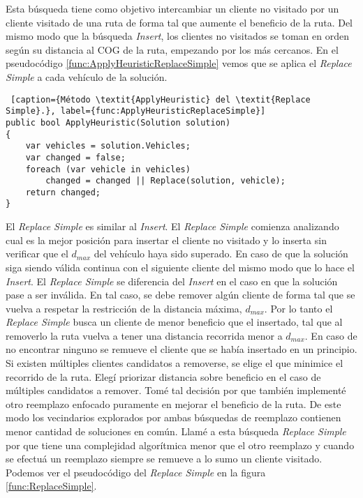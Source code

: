 Esta búsqueda tiene como objetivo intercambiar un cliente no visitado por un cliente visitado de una ruta de forma tal que aumente el beneficio de la ruta. Del mismo modo que la búsqueda \textit{Insert}, los clientes no visitados se toman en orden según su distancia al COG de la ruta, empezando por los más cercanos. En el pseudocódigo \ref{func:ApplyHeuristicReplaceSimple} vemos que se aplica el \textit{Replace Simple} a cada vehículo de la solución.

\bigskip

\begin{minipage}{\textwidth}
\begin{lstlisting} [caption={Método \textit{ApplyHeuristic} del \textit{Replace Simple}.}, label={func:ApplyHeuristicReplaceSimple}]
public bool ApplyHeuristic(Solution solution)
{	
	var vehicles = solution.Vehicles;
	var changed = false;	
	foreach (var vehicle in vehicles)
		changed = changed || Replace(solution, vehicle);
	return changed;
}
\end{lstlisting}
\end{minipage}

\bigskip

El \textit{Replace Simple} es similar al \textit{Insert}. El \textit{Replace Simple} comienza analizando cual es la mejor posición para insertar el cliente no visitado y lo inserta sin verificar que el $d_{max}$ del vehículo haya sido superado. En caso de que la solución siga siendo válida continua con el siguiente cliente del mismo modo que lo hace el \textit{Insert}. El \textit{Replace Simple} se diferencia del \textit{Insert} en el caso en que la solución pase a ser inválida. En tal caso, se debe remover algún cliente de forma tal que se vuelva a respetar la restricción de la distancia máxima, $d_{max}$. Por lo tanto el \textit{Replace Simple} busca un cliente de menor beneficio que el insertado, tal que al removerlo la ruta vuelva a tener una distancia recorrida menor a $d_{max}$. En caso de no encontrar ninguno se remueve el cliente que se había insertado en un principio. Si existen múltiples clientes candidatos a removerse, se elige el que minimice el recorrido de la ruta. Elegí priorizar distancia sobre beneficio en el caso de múltiples candidatos a remover. Tomé tal decisión por que también implementé otro reemplazo enfocado puramente en mejorar el beneficio de la ruta. De este modo los vecindarios explorados por ambas búsquedas de reemplazo contienen menor cantidad de soluciones en común. Llamé a esta búsqueda \textit{Replace Simple} por que tiene una complejidad algorítmica menor que el otro reemplazo y cuando se efectuá un reemplazo siempre se remueve a lo sumo un cliente visitado. Podemos ver el pseudocódigo del \textit{Replace Simple} en la figura \ref{func:ReplaceSimple}.


